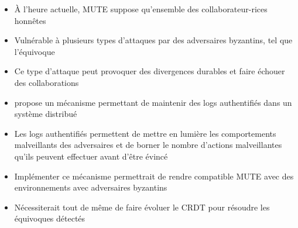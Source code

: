 \begin{itemize}
    \item À l'heure actuelle, MUTE suppose qu'ensemble des collaborateur-rices honnêtes
    \item Vulnérable à plusieurs types d'attaques par des adversaires byzantins, tel que l'équivoque
    \item Ce type d'attaque peut provoquer des divergences durables et faire échouer des collaborations
    \item \textcite{2021-these-vic} propose un mécanisme permettant de maintenir des logs authentifiés dans un système distribué
    \item Les logs authentifiés permettent de mettre en lumière les comportements malveillants des adversaires et de borner le nombre d'actions malveillantes qu'ils peuvent effectuer avant d'être évincé
    \item Implémenter ce mécanisme permettrait de rendre compatible MUTE avec des environnements avec adversaires byzantins
    \item Nécessiterait tout de même de faire évoluer le \ac{CRDT} pour résoudre les équivoques détectés
  \end{itemize}
